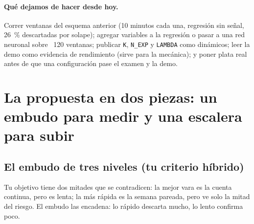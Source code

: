 \documentclass[11pt,a4paper]{article}
\newcommand{\code}[1]{\texttt{\small #1}}
\begin{document}
\paragraph{Qué dejamos de hacer desde hoy.} Correr ventanas del esquema anterior (10 minutos cada una, regresión sin señal,
26~\% descartadas por solape); agregar variables a la regresión o pasar a una red neuronal sobre ~120 ventanas;
publicar \code{K}, \code{N\_EXP} y \code{LAMBDA} como dinámicos; leer la demo como evidencia de rendimiento (sirve para la
mecánica); y poner plata real antes de que una configuración pase el examen y la demo.

\section{La propuesta en dos piezas: un embudo para medir y una escalera para subir}

\subsection{El embudo de tres niveles (tu criterio híbrido)}\label{sec:embudo}

Tu objetivo tiene dos mitades que se contradicen: la mejor vara es la cuenta continua, pero es lenta; la más
rápida es la semana pareada, pero ve solo la mitad del riesgo. El embudo las encadena: lo rápido descarta mucho,
lo lento confirma poco.
\end{document}
